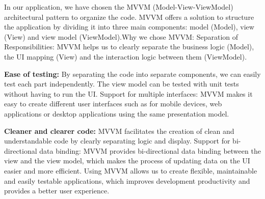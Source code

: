 \hrulefill 
\vspace{0.5cm}
\par
In our  application, we have chosen the MVVM (Model-View-ViewModel) architectural pattern to organize the code. MVVM offers a solution to structure the application by dividing it into three main components: model (Model), view (View) and view model (ViewModel).Why we chose MVVM: Separation of Responsibilities: MVVM helps us to clearly separate the business logic (Model), the UI mapping (View) and the interaction logic between them (ViewModel).
\vspace{0.5cm}
\par
\textbf{Ease of testing:} By separating the code into separate components, we can easily test each part independently. The view model can be tested with unit tests without having to run the UI.
Support for multiple interfaces: MVVM makes it easy to create different user interfaces such as for mobile devices, web applications or desktop applications using the same presentation model.
\vspace{0.5cm}
\par
\textbf{Cleaner and clearer code:} MVVM facilitates the creation of clean and understandable code by clearly separating logic and display.
Support for bi-directional data binding: MVVM provides bi-directional data binding between the view and the view model, which makes the process of updating data on the UI easier and more efficient. Using MVVM allows us to create flexible, maintainable and easily testable applications, which improves development productivity and provides a better user experience.
